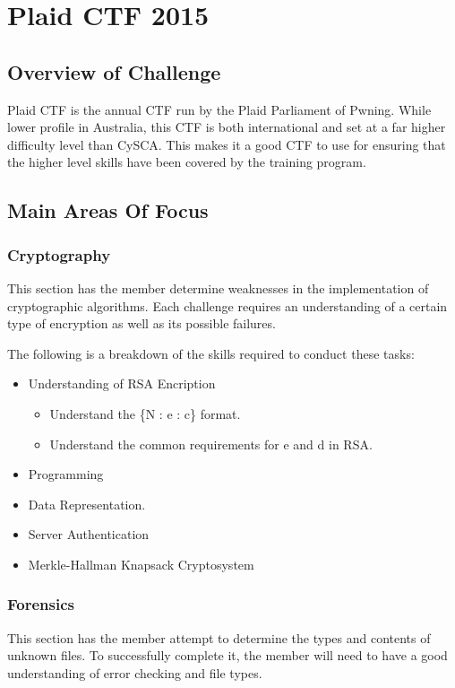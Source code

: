 \documentclass[a4paper,11pt]{report}
\begin{document}
\chapter{Plaid CTF 2015}
	\section{Overview of Challenge}
		Plaid CTF is the annual CTF run by the Plaid Parliament of Pwning. 
		While lower profile in Australia, this CTF is both international and set at a far higher difficulty level than CySCA. 
		This makes it a good CTF to use for ensuring that the higher level skills have been covered by the training program. 
	
	\section{Main Areas Of Focus}
		\subsection{Cryptography}
			This section has the member determine weaknesses in the implementation of cryptographic algorithms. 
			Each challenge requires an understanding of a certain type of encryption as well as its possible failures. 


			The following is a breakdown of the skills required to conduct these tasks:
			\begin{itemize}
				\item Understanding of RSA Encription
				\begin{itemize}
					\item Understand the \{N : e : c\} format. 
						\item Understand the common requirements for e and d in RSA. 
				\end{itemize}
				\item Programming
				\item Data Representation. 
				\item Server Authentication
				\item Merkle-Hallman Knapsack Cryptosystem
			\end{itemize}
		\subsection{Forensics}
			This section has the member attempt to determine the types and contents of unknown files. 
			To successfully complete it, the member will need to have a good understanding of error checking and file types. 
\end{document}
